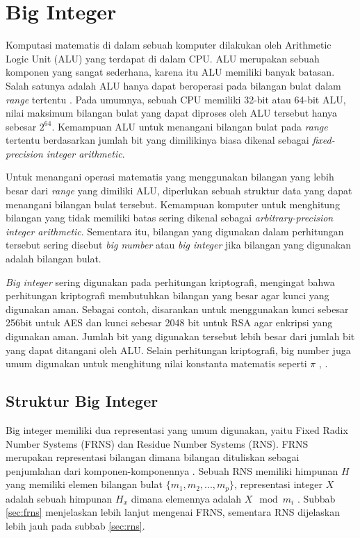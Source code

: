 \section{Big Integer}
  Komputasi matematis di dalam sebuah komputer dilakukan oleh Arithmetic Logic Unit (ALU) yang terdapat di dalam CPU. ALU merupakan sebuah komponen yang sangat sederhana, karena itu ALU memiliki banyak batasan. Salah satunya adalah ALU hanya dapat beroperasi pada bilangan bulat dalam \textit{range} tertentu \citep{comp_org_arch}. Pada umumnya, sebuah CPU memiliki 32-bit atau 64-bit ALU, nilai maksimum bilangan bulat yang dapat diproses oleh ALU tersebut hanya sebesar $2^{64}$. Kemampuan ALU untuk menangani bilangan bulat pada \textit{range} tertentu berdasarkan jumlah bit yang dimilikinya biasa dikenal sebagai \textit{fixed-precision integer arithmetic}.

  Untuk menangani operasi matematis yang menggunakan bilangan yang lebih besar dari \textit{range} yang dimiliki ALU, diperlukan sebuah struktur data yang dapat menangani bilangan bulat tersebut. Kemampuan komputer untuk menghitung bilangan yang tidak memiliki batas sering dikenal sebagai \textit{arbitrary-precision integer arithmetic}. Sementara itu, bilangan yang digunakan dalam perhitungan tersebut sering disebut \textit{big number} atau \textit{big integer} jika bilangan yang digunakan adalah bilangan bulat.

  \textit{Big integer} sering digunakan pada perhitungan kriptografi, mengingat bahwa perhitungan kriptografi membutuhkan bilangan yang besar agar kunci yang digunakan aman. Sebagai contoh, disarankan untuk menggunakan kunci sebesar 256bit untuk AES dan kunci sebesar 2048 bit untuk RSA \citep{key_suggestion} agar enkripsi yang digunakan aman. Jumlah bit yang digunakan tersebut lebih besar dari jumlah bit yang dapat ditangani oleh ALU. Selain perhitungan kriptografi, big number juga umum digunakan untuk menghitung nilai konstanta matematis seperti $\pi$ \citep{bn_pi}, .


  \subsection{Struktur Big Integer}

    Big integer memiliki dua representasi yang umum digunakan, yaitu Fixed Radix Number Systems (FRNS) dan Residue Number Systems (RNS). FRNS merupakan representasi bilangan dimana bilangan dituliskan sebagai penjumlahan dari komponen-komponennya \citep{modern_comp_math}. Sebuah RNS memiliki himpunan $H$ yang memiliki elemen bilangan bulat $\{m_1,m_2,...,m_p\}$, representasi integer $X$ adalah sebuah himpunan $H_x$ dimana elemennya adalah $X \mod m_i$ \citep{rns_survey}. Subbab \ref{sec:frns} menjelaskan lebih lanjut mengenai FRNS, sementara RNS dijelaskan lebih jauh pada subbab \ref{sec:rns}.

